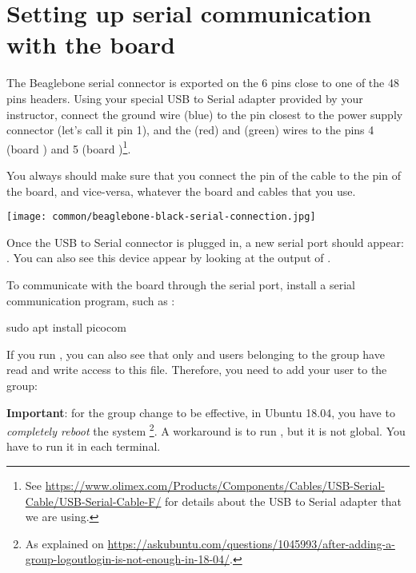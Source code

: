 \section{Setting up serial communication with the board}

The Beaglebone serial connector is exported on the 6 pins close to one
of the 48 pins headers. Using your special USB to Serial adapter provided
by your instructor, connect the ground wire (blue) to the pin closest
to the power supply connector (let's call it pin 1), and the  (red)
and  (green) wires to the pins 4 (board ) and
5 (board )\footnote{See
\url{https://www.olimex.com/Products/Components/Cables/USB-Serial-Cable/USB-Serial-Cable-F/}
for details about the USB to Serial adapter that we are using.}.

You always should make sure that you connect the  pin of the cable
to the  pin of the board, and vice-versa, whatever the board and
cables that you use.

\begin{center}
\texttt{[image: common/beaglebone-black-serial-connection.jpg]}
\end{center}

Once the USB to Serial connector is plugged in, a new serial port
should appear: .  You can also see this device
appear by looking at the output of .

To communicate with the board through the serial port, install a
serial communication program, such as :

\begin{bashinput}
sudo apt install picocom
\end{bashinput}

If you run , you can also see that only
 and users belonging to the  group have
read and write access to this file. Therefore, you need to add your user
to the  group:


{\bf Important}: for the group change to be effective, in Ubuntu 18.04, you have to
{\em completely reboot} the system \footnote{As explained on
\url{https://askubuntu.com/questions/1045993/after-adding-a-group-logoutlogin-is-not-enough-in-18-04/}.}.
A workaround is to run , but it is not global.
You have to run it in each terminal.

